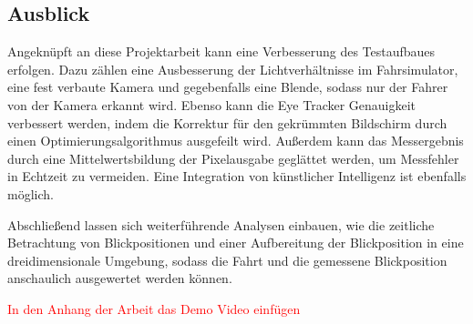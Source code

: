 \subsection{Ausblick}

Angeknüpft an diese Projektarbeit kann eine Verbesserung des Testaufbaues erfolgen. Dazu zählen eine Ausbesserung der Lichtverhältnisse im Fahrsimulator, eine fest verbaute Kamera und gegebenfalls eine Blende, sodass nur der Fahrer von der Kamera erkannt wird. Ebenso kann die Eye Tracker Genauigkeit verbessert werden, indem die Korrektur für den gekrümmten Bildschirm durch einen Optimierungsalgorithmus ausgefeilt wird. Außerdem kann das Messergebnis durch eine Mittelwertsbildung der Pixelausgabe geglättet werden, um Messfehler in Echtzeit zu vermeiden. Eine Integration von künstlicher Intelligenz ist ebenfalls möglich.

Abschließend lassen sich weiterführende Analysen einbauen, wie die zeitliche Betrachtung von Blickpositionen und einer Aufbereitung der Blickposition in eine dreidimensionale Umgebung, sodass die Fahrt und die gemessene Blickposition anschaulich ausgewertet werden können.

\textcolor{red}{In den Anhang der Arbeit das Demo Video einfügen}

\clearpage

\printglossaries
\printbibliography



